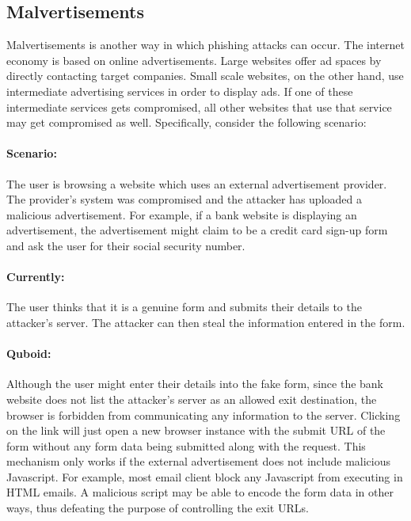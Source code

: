 \subsection{Malvertisements}

Malvertisements is another way in which phishing attacks can occur. The internet economy is based on online advertisements. Large websites offer ad spaces by directly contacting target companies. Small scale websites, on the other hand, use intermediate advertising services in order to display ads. If one of these intermediate services gets compromised, all other websites that use that service may get compromised as well. Specifically, consider the following scenario:

\paragraph{Scenario:} The user is browsing a website which uses an external advertisement provider. The provider's system was compromised and the attacker has uploaded a malicious advertisement. For example, if a bank website is displaying an advertisement, the advertisement might claim to be a credit card sign-up form and ask the user for their social security number.

\paragraph{Currently:} The user thinks that it is a genuine form and submits their details to the attacker's server. The attacker can then steal the information entered in the form.

\paragraph{Quboid:} Although the user might enter their details into the fake form, since the bank website does not list the attacker's server as an allowed exit destination, the browser is forbidden from communicating any information to the server. Clicking on the link will just open a new browser instance with the submit URL of the form without any form data being submitted along with the request. This mechanism only works if the external advertisement does not include malicious Javascript. For example, most email client block any Javascript from executing in HTML emails. A malicious script may be able to encode the form data in other ways, thus defeating the purpose of controlling the exit URLs.

